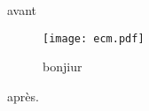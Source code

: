 \documentclass{article}
\begin{document}
avant

\begin{figure}
	\centering
\texttt{[image: ecm.pdf]}
\caption{bonjiur}
\end{figure}

après.
\end{document}
